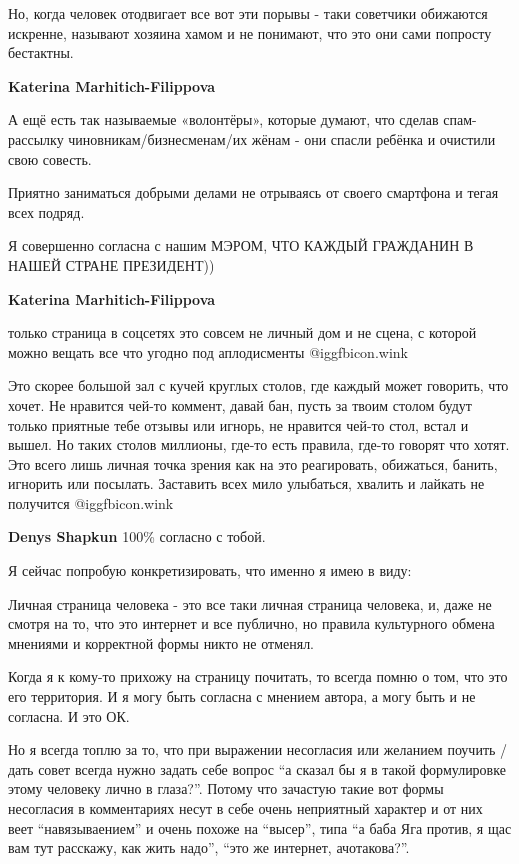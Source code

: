 \begin{itemize}
Но, когда человек отодвигает все вот эти порывы - таки советчики обижаются
искренне, называют хозяина хамом и не понимают, что это они сами попросту
бестактны.

\begin{itemize} %
\textbf{Katerina Marhitich-Filippova} 

А ещё есть так называемые «волонтёры», которые думают, что сделав спам-рассылку
чиновникам/бизнесменам/их жёнам - они спасли ребёнка и очистили свою совесть.

Приятно заниматься добрыми делами не отрываясь от своего смартфона и тегая всех
подряд.


Я совершенно согласна с нашим МЭРОМ, ЧТО КАЖДЫЙ ГРАЖДАНИН В НАШЕЙ СТРАНЕ ПРЕЗИДЕНТ))

\textbf{Katerina Marhitich-Filippova} 

только страница в соцсетях это совсем не личный дом и не сцена, с которой можно
вещать все что угодно под аплодисменты @igg{fbicon.wink} 

Это скорее большой зал с кучей круглых столов, где каждый может говорить, что
хочет. Не нравится чей-то коммент, давай бан, пусть за твоим столом будут
только приятные тебе отзывы или игнорь, не нравится чей-то стол, встал и вышел.
Но таких столов миллионы, где-то есть правила, где-то говорят что хотят. Это
всего лишь личная точка зрения как на это реагировать, обижаться, банить,
игнорить или посылать. Заставить всех мило улыбаться, хвалить и лайкать не
получится @igg{fbicon.wink} 

\textbf{Denys Shapkun} 100\% согласно с тобой.

Я сейчас попробую конкретизировать, что именно я имею в виду:

Личная страница человека - это все таки личная страница человека, и, даже не
смотря на то, что это интернет и все публично, но правила культурного обмена
мнениями и корректной формы никто не отменял.

Когда я к кому-то прихожу на страницу почитать, то всегда помню о том, что это
его территория. И я могу быть согласна с мнением автора, а могу быть и не
согласна. И это ОК.

Но я всегда топлю за то, что при выражении несогласия или желанием поучить /
дать совет всегда нужно задать себе вопрос \enquote{а сказал бы я в такой формулировке
этому человеку лично в глаза?}. Потому что зачастую такие вот формы несогласия
в комментариях несут в себе очень неприятный характер и от них веет
\enquote{навязываением} и очень похоже на \enquote{высер}, типа \enquote{а баба Яга против, я щас вам
тут расскажу, как жить надо}, \enquote{это же интернет, ачотакова?}.


\end{itemize}
\end{itemize}
